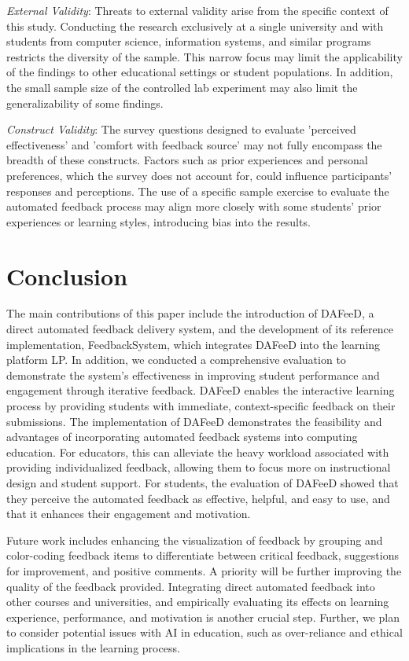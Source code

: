\documentclass[sigconf,screen,review,anonymous]{acmart}
\begin{document}
\textit{External Validity}: Threats to external validity arise from the specific context of this study. 
Conducting the research exclusively at a single university and with students from computer science, information systems, and similar programs restricts the diversity of the sample. 
This narrow focus may limit the applicability of the findings to other educational settings or student populations. 
In addition, the small sample size of the controlled lab experiment may also limit the generalizability of some findings. 

\textit{Construct Validity}: 
The survey questions designed to evaluate 'perceived effectiveness' and 'comfort with feedback source' may not fully encompass the breadth of these constructs.
Factors such as prior experiences and personal preferences, which the survey does not account for, could influence participants' responses and perceptions.
The use of a specific sample exercise to evaluate the automated feedback process may align more closely with some students' prior experiences or learning styles, introducing bias into the results.


\section{Conclusion} %
\label{sec:conclusion}

The main contributions of this paper include the introduction of DAFeeD, a direct automated feedback delivery system, and the development of its reference implementation, FeedbackSystem, which integrates DAFeeD into the learning platform LP.
In addition, we conducted a comprehensive evaluation to demonstrate the system's effectiveness in improving student performance and engagement through iterative feedback.
DAFeeD enables the interactive learning process by providing students with immediate, context-specific feedback on their submissions.
The implementation of DAFeeD demonstrates the feasibility and advantages of incorporating automated feedback systems into computing education. 
For educators, this can alleviate the heavy workload associated with providing individualized feedback, allowing them to focus more on instructional design and student support.
For students, the evaluation of DAFeeD showed that they perceive the automated feedback as effective, helpful, and easy to use, and that it enhances their engagement and motivation.

% 
Future work includes enhancing the visualization of feedback by grouping and color-coding feedback items to differentiate between critical feedback, suggestions for improvement, and positive comments. 
A priority will be further improving the quality of the feedback provided.
Integrating direct automated feedback into other courses and universities, and empirically evaluating its effects on learning experience, performance, and motivation is another crucial step.
Further, we plan to consider potential issues with AI in education, such as over-reliance and ethical implications in the learning process.
\end{document}

